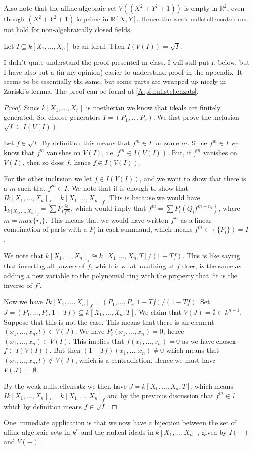 Also note that the affine algebraic set $V((X^2+Y^2+1))$ is empty in $\mathbb{R}^2$, even though $(X^2+Y^2+1)$ is prime in $\mathbb{R}[X, Y]$. Hence the weak nullstellensatz does not hold for non-algebraically closed fields. 

\begin{theorem}
Let $I\subseteq k[X_1, \ldots,X_n]$ be an ideal. Then $I(V(I))=\sqrt{I}$. 
\end{theorem}
I didn't quite understand the proof presented in class. I will still put it below, but I have also put a (in my opinion) easier to understand proof in the appendix. It seems to be essentially the same, but some parts are wrapped up nicely in Zariski's lemma. The proof can be found at \cref{A:pf:nullstellenzats}. 
\begin{proof}
Since $k[X_1, \ldots,X_n]$ is noetherian we know that ideals are finitely generated. So, choose generators $I=(P_1, \ldots, P_r)$. We first prove the inclusion $\sqrt{I}\subseteq I(V(I))$.

Let $f\in \sqrt{I}$. By definition this means that $f^m\in I$ for some $m$. Since $f^m\in I$ we know that $f^m$ vanishes on $V(I)$, i.e. $f^m\in I(V(I))$. But, if $f^m$ vanishes on $V(I)$, then so does $f$, hence $f\in I(V(I))$. 

For the other inclusion we let $f\in I(V(I))$, and we want to show that there is a $m$ such that $f^m\in I$. We note that it is enough to show that $Ik[X_1, \ldots,X_n]_f=k[X_1, \ldots,X_n]_f$. This is because we would have $1_{k[X_1, \ldots,X_n]_f}=\sum P_i\frac{Q_i}{f^{n_i}}$, which would imply that $f^m=\sum P_i(Q_if^{m-n_i})$, where $m=max\{n_i\}$. This means that we would have written $f^m$ as a linear combination of parts with a $P_i$ in each summand, which means $f^m\in (\{P_i\})=I$. 

We note that $k[X_1, \ldots,X_n]_f\cong k[X_1, \ldots,X_n, T]/(1-Tf)$. This is like saying that inverting all powers of $f$, which is what localizing at $f$ does, is the same as adding a new variable to the polynomial ring with the property that ``it is the inverse of $f$''. 

Now we have $Ik[X_1, \ldots,X_n]_f = (P_1, \ldots, P_r, 1-Tf)/(1-Tf)$. Set $J=(P_1, \ldots, P_r, 1-Tf)\subseteq k[X_1, \ldots,X_n, T]$. We claim that $V(J)=\emptyset \subset k^{n+1}$. Suppose that this is not the case. This means that there is an element $(x_1, \ldots, x_n, t)\in V(J)$. We have $P_i(x_1, \ldots, x_n)=0$, hence $(x_1, \ldots, x_n)\in V(I)$. This implies that $f(x_1, \ldots, x_n)=0$ as we have chosen $f\in I(V(I))$. But then $(1-Tf)(x_1, \ldots, x_n)\neq 0$ which means that $(x_1, \ldots, x_n, t)\notin V(J)$, which is a contradiction. Hence we must have $V(J)=\emptyset$. 

By the weak nullstellensatz we then have $J=k[X_1, \ldots,X_n, T]$, which means $Ik[X_1, \ldots,X_n]_f=k[X_1, \ldots,X_n]_f$ and by the previous discussion that $f^m\in I$ which by definition means $f\in \sqrt{I}$. 
\end{proof}

One immediate application is that we now have a bijection between the set of affine algebraic sets in $k^n$ and the radical ideals in $k[X_1, \ldots, X_n]$, given by $I(-)$ and $V(-)$. 